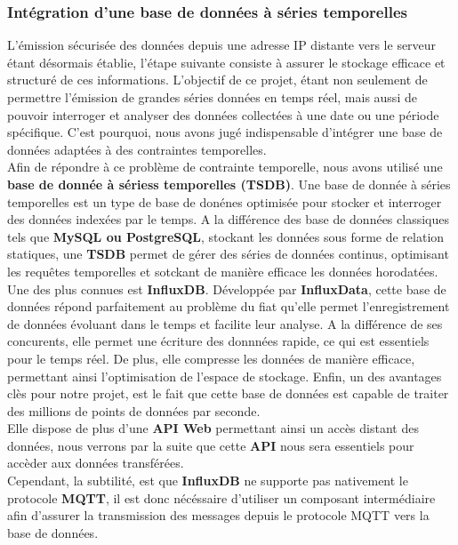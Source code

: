 \documentclass[10pt, a4paper]{report}
\begin{document}
	
	
	\subsubsection{Intégration d'une base de données à séries temporelles}
	
	L'émission sécurisée des données depuis une adresse IP distante vers le serveur étant désormais établie, l'étape suivante consiste à assurer le stockage efficace et structuré de ces informations. L'objectif de ce projet, étant non seulement de permettre l'émission de grandes séries données en temps réel, mais aussi de pouvoir interroger et analyser des données collectées à une date ou une période spécifique. C'est pourquoi, nous avons jugé indispensable d'intégrer une base de données adaptées à des contraintes temporelles.\\
	Afin de répondre à ce problème de contrainte temporelle, nous avons utilisé une \textbf{base de donnée à sériess temporelles (TSDB)}. Une base de donnée à séries temporelles est un type de base de donénes optimisée pour stocker et interroger des données indexées par le temps. A la différence des base de données classiques tels que \textbf{MySQL ou PostgreSQL}, stockant les données sous forme de relation statiques, une \textbf{TSDB} permet de gérer des séries de données continus, optimisant les requêtes temporelles et sotckant de manière efficace les données horodatées.\\
	Une des plus connues est \textbf{InfluxDB}. Développée par \textbf{InfluxData}, cette base de données répond parfaitement au problème du fiat qu'elle permet l'enregistrement de données évoluant dans le temps et facilite leur analyse. A la différence de ses concurents, elle permet une écriture des donnnées rapide, ce qui est essentiels pour le temps réel. De plus, elle compresse les données de manière efficace, permettant ainsi l'optimisation de l'espace de stockage. Enfin, un des avantages clès pour notre projet, est le fait que cette base de données est capable de traiter des millions de points de données par seconde.\\
	Elle dispose de plus d'une \textbf{API Web} permettant ainsi un accès distant des données, nous verrons par la suite que cette \textbf{API} nous sera essentiels pour accèder aux données transférées.\\
	Cependant, la subtilité, est que \textbf{InfluxDB} ne supporte pas nativement le protocole \textbf{MQTT}, il est donc nécéssaire d'utiliser un composant intermédiaire afin d'assurer la transmission des messages depuis le protocole MQTT vers la base de données.\\
\end{document}
